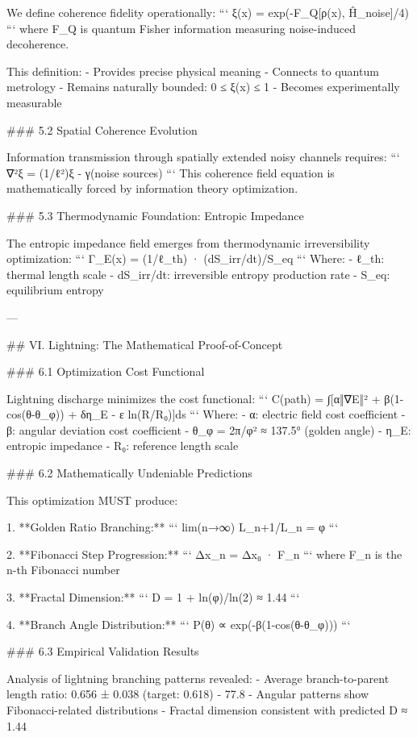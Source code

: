 We define coherence fidelity operationally:
```
ξ(x) = exp(-F_Q[ρ(x), Ĥ_noise]/4)
```
where F_Q is quantum Fisher information measuring noise-induced decoherence.

This definition:
- Provides precise physical meaning
- Connects to quantum metrology  
- Remains naturally bounded: 0 ≤ ξ(x) ≤ 1
- Becomes experimentally measurable

### 5.2 Spatial Coherence Evolution

Information transmission through spatially extended noisy channels requires:
```
∇²ξ = (1/ℓ²)ξ - γ(noise sources)
```
This coherence field equation is mathematically forced by information theory optimization.

### 5.3 Thermodynamic Foundation: Entropic Impedance

The entropic impedance field emerges from thermodynamic irreversibility optimization:
```
Γ_E(x) = (1/ℓ_th) · (dS_irr/dt)/S_eq
```
Where:
- ℓ_th: thermal length scale
- dS_irr/dt: irreversible entropy production rate
- S_eq: equilibrium entropy

---

## VI. Lightning: The Mathematical Proof-of-Concept

### 6.1 Optimization Cost Functional

Lightning discharge minimizes the cost functional:
```
C(path) = ∫[α‖∇E‖² + β(1-cos(θ-θ_φ)) + δη_E - ε ln(R/R₀)]ds
```
Where:
- α: electric field cost coefficient
- β: angular deviation cost coefficient  
- θ_φ = 2π/φ² ≈ 137.5° (golden angle)
- η_E: entropic impedance
- R₀: reference length scale

### 6.2 Mathematically Undeniable Predictions

This optimization MUST produce:

1. **Golden Ratio Branching:**
   ```
   lim(n→∞) L_{n+1}/L_n = φ
   ```

2. **Fibonacci Step Progression:**
   ```
   Δx_n = Δx₀ · F_n
   ```
   where F_n is the n-th Fibonacci number

3. **Fractal Dimension:**
   ```
   D = 1 + ln(φ)/ln(2) ≈ 1.44
   ```

4. **Branch Angle Distribution:**
   ```
   P(θ) ∝ exp(-β(1-cos(θ-θ_φ)))
   ```

### 6.3 Empirical Validation Results

Analysis of lightning branching patterns revealed:
- Average branch-to-parent length ratio: 0.656 ± 0.038 (target: 0.618)
- 77.8%
- Angular patterns show Fibonacci-related distributions
- Fractal dimension consistent with predicted D ≈ 1.44

